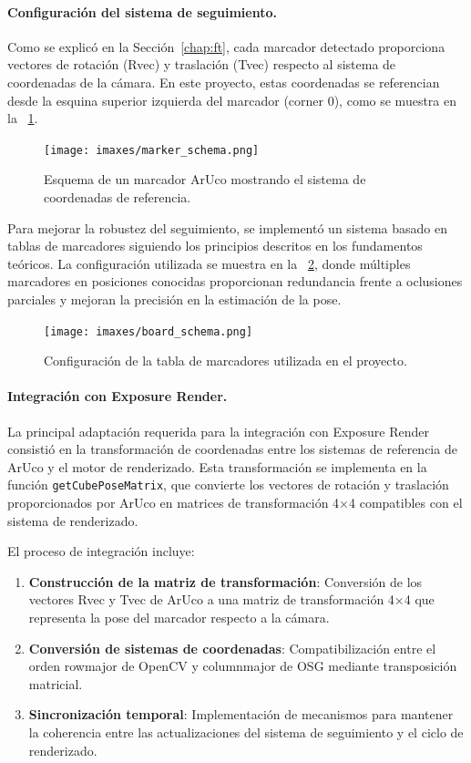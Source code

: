\paragraph{Configuración del sistema de seguimiento.}
Como se explicó en la Sección~\ref{chap:ft}, cada marcador detectado proporciona vectores de rotación (Rvec) y traslación (Tvec) respecto al sistema de coordenadas de la cámara. En este proyecto, estas coordenadas se referencian desde la esquina superior izquierda del marcador (corner 0), como se muestra en la \figurename~\ref{fig:marker_schema}.

\begin{figure}
	\centering
	\texttt{[image: imaxes/marker\_schema.png]}
	\caption{Esquema de un marcador ArUco mostrando el sistema de coordenadas de referencia.}
	\label{fig:marker_schema}
\end{figure}

Para mejorar la robustez del seguimiento, se implementó un sistema basado en tablas de marcadores siguiendo los principios descritos en los fundamentos teóricos. La configuración utilizada se muestra en la \figurename~\ref{fig:board_schema}, donde múltiples marcadores en posiciones conocidas proporcionan redundancia frente a oclusiones parciales y mejoran la precisión en la estimación de la pose.

\begin{figure}
	\centering
	\texttt{[image: imaxes/board\_schema.png]}
	\caption{Configuración de la tabla de marcadores utilizada en el proyecto.}
	\label{fig:board_schema}
\end{figure}

\paragraph{Integración con Exposure Render.}
La principal adaptación requerida para la integración con Exposure Render consistió en la transformación de coordenadas entre los sistemas de referencia de ArUco y el motor de renderizado. Esta transformación se implementa en la función \texttt{getCubePoseMatrix}, que convierte los vectores de rotación y traslación proporcionados por ArUco en matrices de transformación 4×4 compatibles con el sistema de renderizado.

El proceso de integración incluye:
\begin{enumerate}
	\item \textbf{Construcción de la matriz de transformación}: Conversión de los vectores Rvec y Tvec de ArUco a una matriz de transformación 4×4 que representa la pose del marcador respecto a la cámara.
	\item \textbf{Conversión de sistemas de coordenadas}: Compatibilización entre el orden \gls{rowmajor} de OpenCV y \gls{columnmajor} de OSG mediante transposición matricial.
	\item \textbf{Sincronización temporal}: Implementación de mecanismos para mantener la coherencia entre las actualizaciones del sistema de seguimiento y el ciclo de renderizado.
\end{enumerate}

